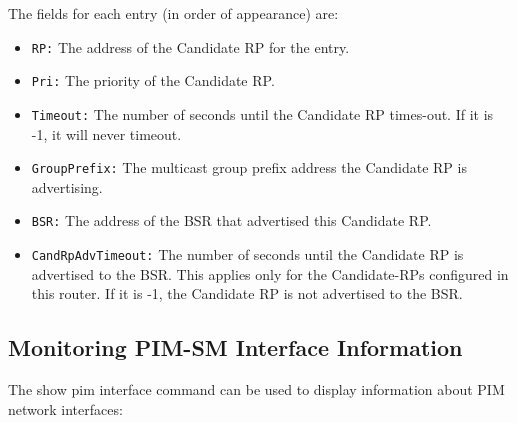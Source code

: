 The fields for each entry (in order of appearance) are:
\begin{itemize}
  \item {\tt RP:} The address of the Candidate RP for the entry.

  \item {\tt Pri:} The priority of the Candidate RP.

  \item {\tt Timeout:} The number of seconds until the Candidate RP times-out.
  If it is -1, it will never timeout.

  \item {\tt GroupPrefix:} The multicast group prefix address the Candidate RP
  is advertising.

  \item {\tt BSR:} The address of the BSR that advertised this Candidate RP.

  \item {\tt CandRpAdvTimeout:} The number of seconds until the Candidate RP
  is advertised to the BSR. This applies only for the Candidate-RPs
  configured in this router.
  If it is -1, the Candidate RP is not advertised to the BSR.

\end{itemize}

\subsection{Monitoring PIM-SM Interface Information}

The {\stt show pim interface} command can be used to display
information about PIM network interfaces:

\vspace{0.1in}
\noindent{}
\vspace{0.1in}

